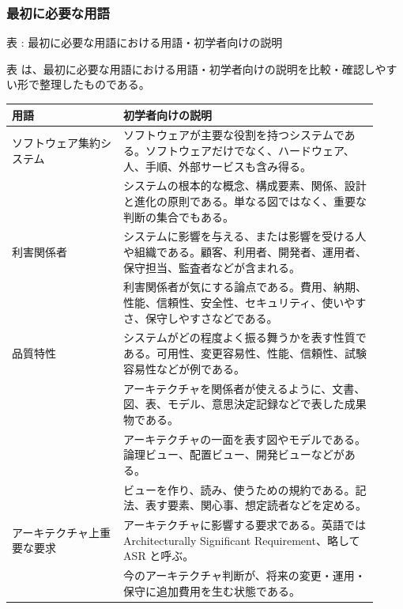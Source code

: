 \subsubsection*{最初に必要な用語}
\par\smallskip\noindent{}\label{tab:ch02-01}表 \thetable: 最初に必要な用語における用語・初学者向けの説明\par\smallskip
表 \thetable は、最初に必要な用語における用語・初学者向けの説明を比較・確認しやすい形で整理したものである。\par\smallskip
\begin{longtable}{P{0.28\linewidth}P{0.64\linewidth}}
\toprule
用語 & 初学者向けの説明 \\
\midrule
ソフトウェア集約システム & ソフトウェアが主要な役割を持つシステムである。ソフトウェアだけでなく、ハードウェア、人、手順、外部サービスも含み得る。 \\
 & システムの根本的な概念、構成要素、関係、設計と進化の原則である。単なる図ではなく、重要な判断の集合でもある。 \\
利害関係者 & システムに影響を与える、または影響を受ける人や組織である。顧客、利用者、開発者、運用者、保守担当、監査者などが含まれる。 \\
 & 利害関係者が気にする論点である。費用、納期、性能、信頼性、安全性、セキュリティ、使いやすさ、保守しやすさなどである。 \\
品質特性 & システムがどの程度よく振る舞うかを表す性質である。可用性、変更容易性、性能、信頼性、試験容易性などが例である。 \\
 & アーキテクチャを関係者が使えるように、文書、図、表、モデル、意思決定記録などで表した成果物である。 \\
 & アーキテクチャの一面を表す図やモデルである。論理ビュー、配置ビュー、開発ビューなどがある。 \\
 & ビューを作り、読み、使うための規約である。記法、表す要素、関心事、想定読者などを定める。 \\
アーキテクチャ上重要な要求 & アーキテクチャに影響する要求である。英語では Architecturally Significant Requirement、略して ASR と呼ぶ。 \\
 & 今のアーキテクチャ判断が、将来の変更・運用・保守に追加費用を生む状態である。 \\
\bottomrule
\end{longtable}
